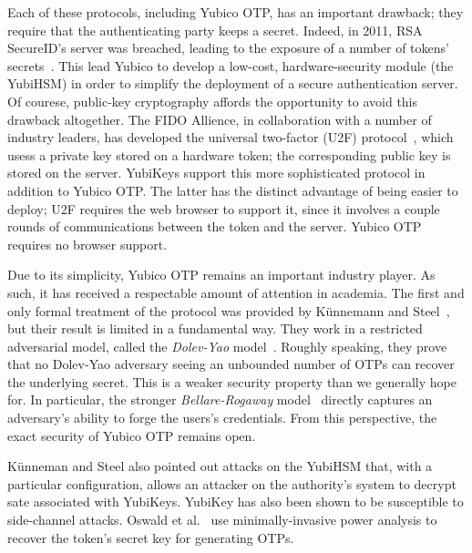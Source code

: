 Each of these protocols, including Yubico OTP, has an important drawback; they
require that the authenticating party keeps a secret. Indeed, in 2011, RSA
SecureID's server was breached, leading to the exposure of a number of tokens'
secrets~\cite{kaminsky2011securid}. This lead Yubico to develop a low-cost,
hardware-security module (the YubiHSM) in order to simplify the deployment of a
secure authentication server.
%
Of courese, public-key cryptography affords the opportunity to avoid this
drawback altogether. The FIDO Allience, in collaboration with a number of
industry leaders, has developed the universal two-factor (U2F)
protocol~\cite{u2f}, which usess a private key stored on a hardware token; the
corresponding public key is stored on the server.
%
YubiKeys support this more sophisticated protocol in addition to Yubico OTP. The
latter has the distinct advantage of being easier to deploy; U2F requires the
web browser to support it, since it involves a couple rounds of communications
between the token and the server. Yubico OTP requires no browser support.

Due to its simplicity, Yubico OTP remains an important industry player. As such,
it has received a respectable amount of attention in academia.
%
The first and only formal treatment of the protocol was provided by K\"unnemann and
Steel~\cite{kuennemann2012yubisecure}, but their result is limited in a
fundamental way. They work in a restricted adversarial model, called the
\emph{Dolev-Yao} model~\cite{herzog2005computational}. Roughly speaking, they
prove that no Dolev-Yao adversary seeing an unbounded number of OTPs can recover
the underlying secret. This is a weaker security property than we generally hope
for. In particular, the stronger \emph{Bellare-Rogaway}
model~\cite{bellare1993entity} directly captures an adversary's ability to forge
the users's credentials.  From this perspective, the exact security of Yubico
OTP remains open.

K\"unneman and Steel also pointed out attacks on the YubiHSM that, with a
particular configuration, allows an attacker on the authority's system to
decrypt sate associated with YubiKeys.
%
YubiKey has also been shown to be susceptible to side-channel attacks. Oswald et
al.~\cite{oswald2013side-channel} use minimally-invasive power analysis to
recover the token's secret key for generating OTPs.

